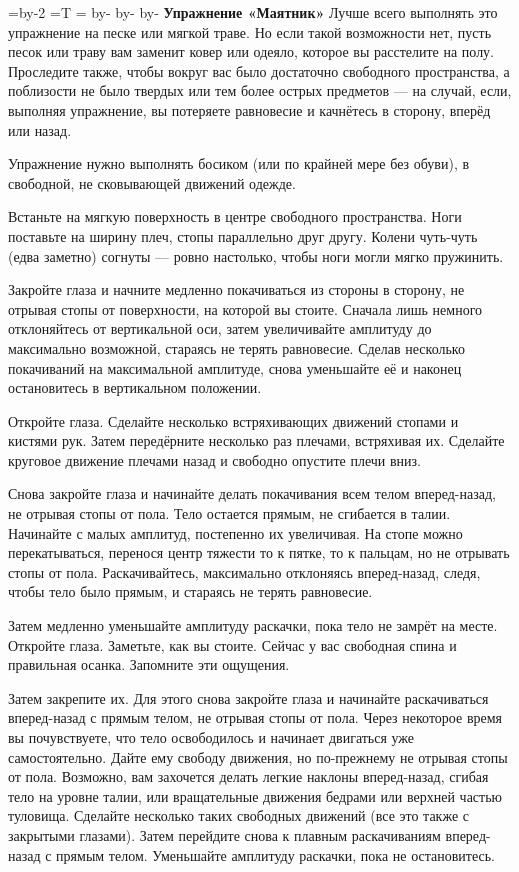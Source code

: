 \pdfhorigin=13mm \hsize=\pdfpagewidth \advance\hsize by-2\pdfhorigin
\pdfvorigin=15mm =\hbox{T} =\topskip \advance{} by-
  \advance\pdfvorigin by-
\vsize=282mm \advance\vsize by-\pdfvorigin
\nopagenumbers
{\bf Упражнение «Маятник»}
\medskip
Лучше всего выполнять это упражнение на песке или мягкой траве. Но если такой возможности нет, пусть песок или траву вам заменит ковер или одеяло, которое вы расстелите на полу. Проследите также, чтобы вокруг вас было достаточно свободного пространства, а поблизости не было твердых или тем более острых предметов --- на случай, если, выполняя
упражнение, вы потеряете равновесие и качнётесь
в сторону, вперёд или назад.

Упражнение нужно выполнять босиком (или по крайней мере без обуви), в свободной, не сковывающей движений одежде.

Встаньте на мягкую поверхность в центре свободного пространства. Ноги поставьте на ширину плеч, стопы параллельно друг другу. Колени чуть-чуть (едва заметно) согнуты --- ровно настолько, чтобы ноги
могли мягко пружинить.

Закройте глаза и начните медленно покачиваться из стороны в сторону, не отрывая стопы от поверхности, на которой вы стоите. Сначала лишь немного отклоняйтесь от вертикальной оси, затем увеличивайте амплитуду до максимально возможной, стараясь не терять равновесие. Сделав несколько покачиваний на максимальной амплитуде, снова уменьшайте её и наконец остановитесь в вертикальном положении.

Откройте глаза. Сделайте несколько встряхивающих движений стопами и кистями рук. Затем передёрните несколько раз плечами, встряхивая их. Сделайте круговое движение плечами назад и свободно
опустите плечи вниз.

Снова закройте глаза и начинайте делать покачивания всем телом вперед-назад, не отрывая стопы от пола. Тело остается прямым, не сгибается в талии. Начинайте с малых амплитуд, постепенно их увеличивая. На стопе можно перекатываться, перенося центр тяжести то к пятке, то к пальцам, но не отрывать стопы от пола. Раскачивайтесь, максимально отклоняясь вперед-назад, следя, чтобы тело было
прямым, и стараясь не терять равновесие.

Затем медленно уменьшайте амплитуду раскачки, пока тело не замрёт на месте. Откройте глаза. Заметьте, как вы стоите. Сейчас у вас свободная спина и правильная осанка. Запомните эти ощущения.

Затем закрепите их. Для этого снова закройте глаза и начинайте раскачиваться вперед-назад с прямым телом, не отрывая стопы от пола. Через некоторое время вы почувствуете, что тело освободилось и начинает двигаться уже самостоятельно. Дайте ему свободу движения, но по-прежнему не отрывая стопы от пола. Возможно, вам захочется делать легкие наклоны вперед-назад, сгибая тело на уровне талии, или вращательные движения бедрами или верхней частью туловища. Сделайте несколько таких свободных движений (все это также с закрытыми глазами). Затем перейдите снова к плавным раскачиваниям вперед-назад с прямым телом. Уменьшайте амплитуду раскачки, пока не остановитесь.

